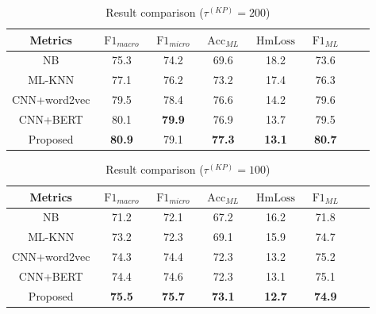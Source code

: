 \begin{table}[H]
	\caption{Result comparison (\(\tau^{(KP)}=200 \))}\label{tbl:bsline1}
	\centering
	\begin{tabular}{cccccccc}
		\toprule
		Metrics      & \(\operatorname{F1}_{macro}\) & \(\operatorname{F1}_{micro}\) & \(\operatorname{Acc}_{ML}\) & \(\operatorname{HmLoss}\) & \(\operatorname{F1}_{ML}\) \\
		\midrule
		NB           & 75.3                          & 74.2                          & 69.6                        & 18.2                      & 73.6                       \\
		ML-KNN       & 77.1                          & 76.2                          & 73.2                        & 17.4                      & 76.3                       \\
		CNN+word2vec & 79.5                          & 78.4                          & 76.6                        & 14.2                      & 79.6                       \\
		CNN+BERT     & 80.1                          & \textbf{79.9}                 & 76.9                        & 13.7                      & 79.5                       \\
		Proposed     & \textbf{80.9}                 & 79.1                          & \textbf{77.3}               & \textbf{13.1}             & \textbf{80.7}              \\
		\bottomrule
	\end{tabular}
\end{table}


\begin{table}
	\centering
	\caption{Result comparison (\(\tau^{(KP)}=100 \))}\label{tbl:bsline2}
	\begin{tabular}{cccccccc}
		\toprule
		Metrics      & \(\operatorname{F1}_{macro}\) & \(\operatorname{F1}_{micro}\) & \(\operatorname{Acc}_{ML}\) & \(\operatorname{HmLoss}\) & \(\operatorname{F1}_{ML}\) \\
		\midrule
		NB           & 71.2                          & 72.1                          & 67.2                        & 16.2                      & 71.8                       \\
		ML-KNN       & 73.2                          & 72.3                          & 69.1                        & 15.9                      & 74.7                       \\
		CNN+word2vec & 74.3                          & 74.4                          & 72.3                        & 13.2                      & 75.2                       \\
		CNN+BERT     & 74.4                          & 74.6                          & 72.3                        & 13.1                      & 75.1                       \\
		Proposed     & \textbf{75.5}                 & \textbf{75.7}                 & \textbf{73.1}               & \textbf{12.7}             & \textbf{74.9}              \\
		\bottomrule
	\end{tabular}
\end{table}

